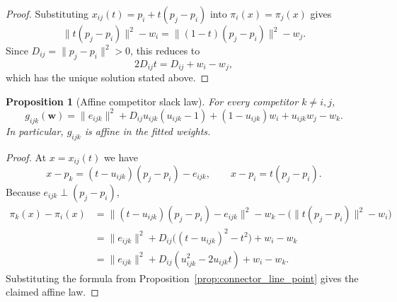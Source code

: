 \documentclass[preprint,12pt]{elsarticle}
\newtheorem{proposition}{Proposition}
\newcommand{\weights}{\mathbf{w}}
\begin{document}
\begin{proof}
Substituting $x_{ij}(t)=p_i+t(p_j-p_i)$ into $\pi_i(x)=\pi_j(x)$ gives
\begin{equation}
    \|t(p_j-p_i)\|^2-w_i=\|(1-t)(p_j-p_i)\|^2-w_j.
\end{equation}
Since $D_{ij}=\|p_j-p_i\|^2>0$, this reduces to
\begin{equation}
    2D_{ij}t=D_{ij}+w_i-w_j,
\end{equation}
which has the unique solution stated above.
\end{proof}

\begin{proposition}[Affine competitor slack law]
\label{prop:competitor_slack_affine}
For every competitor $k\neq i,j$,
\begin{equation}
    g_{ijk}(\weights)=\|e_{ijk}\|^2+D_{ij}u_{ijk}(u_{ijk}-1)
    +(1-u_{ijk})w_i+u_{ijk}w_j-w_k.
\end{equation}
In particular, $g_{ijk}$ is affine in the fitted weights.
\end{proposition}

\begin{proof}
At $x=x_{ij}(t)$ we have
\begin{equation}
    x-p_k=(t-u_{ijk})(p_j-p_i)-e_{ijk},
    \qquad
    x-p_i=t(p_j-p_i).
\end{equation}
Because $e_{ijk}\perp (p_j-p_i)$,
\begin{align}
    \pi_k(x)-\pi_i(x)
    &=\|(t-u_{ijk})(p_j-p_i)-e_{ijk}\|^2-w_k
      -\bigl(\|t(p_j-p_i)\|^2-w_i\bigr) \\
    &=\|e_{ijk}\|^2+D_{ij}\bigl((t-u_{ijk})^2-t^2\bigr)+w_i-w_k \\
    &=\|e_{ijk}\|^2+D_{ij}(u_{ijk}^2-2u_{ijk}t)+w_i-w_k.
\end{align}
Substituting the formula from
Proposition~\ref{prop:connector_line_point} gives the claimed affine law.
\end{proof}
\end{document}
